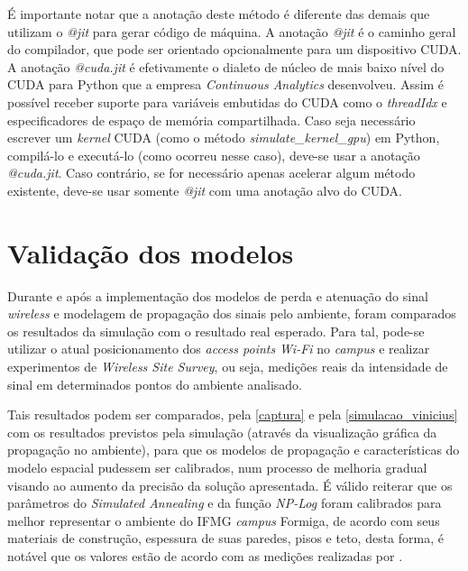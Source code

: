 \documentclass[
	12pt,				%
	twoside,			%
	a4paper,			%
	english,			%
	french,				%
	spanish,			%
	brazil				%
	]{abntex2}
\begin{document}
É importante notar que a anotação deste método é diferente das demais
que utilizam o \emph{@jit} para gerar código de máquina. A anotação
\emph{@jit} é o caminho geral do compilador, que pode ser orientado
opcionalmente para um dispositivo CUDA. A anotação \emph{@cuda.jit} é
efetivamente o dialeto de núcleo de mais baixo nível do CUDA para Python
que a empresa \emph{Continuous Analytics} desenvolveu. Assim é possível
receber suporte para variáveis embutidas do CUDA como o \emph{threadIdx}
e especificadores de espaço de memória compartilhada. Caso seja
necessário escrever um \emph{kernel} CUDA (como o método
\emph{simulate\_kernel\_gpu}) em Python, compilá-lo e executá-lo (como
ocorreu nesse caso), deve-se usar a anotação \emph{@cuda.jit}. Caso
contrário, se for necessário apenas acelerar algum método existente,
deve-se usar somente \emph{@jit} com uma anotação alvo do CUDA.

\section{Validação dos modelos}\label{validauxe7uxe3o-dos-modelos}

Durante e após a implementação dos modelos de perda e atenuação do sinal
\emph{wireless} e modelagem de propagação dos sinais pelo ambiente,
foram comparados os resultados da simulação com o resultado real
esperado. Para tal, pode-se utilizar o atual posicionamento dos
\emph{access points} \emph{Wi-Fi} no \emph{campus} e realizar
experimentos de \emph{Wireless Site Survey}, ou seja, medições reais da
intensidade de sinal em determinados pontos do ambiente analisado.

Tais resultados podem ser comparados, pela \autoref{captura} e pela
\autoref{simulacao_vinicius} com os resultados previstos pela simulação
(através da visualização gráfica da propagação no ambiente), para que os
modelos de propagação e características do modelo espacial pudessem ser
calibrados, num processo de melhoria gradual visando ao aumento da
precisão da solução apresentada. É válido reiterar que os parâmetros do
\emph{Simulated Annealing} e da função \emph{NP-Log} foram calibrados
para melhor representar o ambiente do IFMG \emph{campus} Formiga, de
acordo com seus materiais de construção, espessura de suas paredes,
pisos e teto, desta forma, é notável que os valores estão de acordo com
as medições realizadas por \cite{VINICIUS}.
\end{document}

